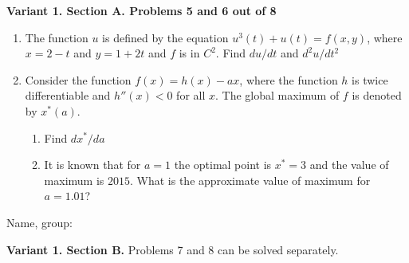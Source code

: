\documentclass[12pt,a4paper]{article}
\begin{document}
\newpage
\textbf{Variant 1. Section A. Problems 5 and 6 out of 8}


\begin{enumerate}[resume]

\item The function $u$ is defined by the equation $u^3(t) + u(t) = f(x,y)$, where $x=2-t$ and $y=1+2t$ and $f$ is in $C^2$. Find $du/dt$ and $d^2 u/dt^2$



\item Consider the function $f(x)=h(x)-ax$, where the function $h$ is twice differentiable and $h''(x)<0$ for all $x$. The global maximum of $f$ is denoted by $x^*(a)$.
\begin{enumerate}
\item Find $dx^*/da$
\item It is known that for $a=1$ the optimal point is $x^*=3$ and the value of maximum is $2015$. What is the approximate value of maximum for $a=1.01$?
\end{enumerate}

\end{enumerate}

\begin{framed}
\begin{minipage}{42em}
Name, group:\vspace*{3ex}\par 
\noindent\dotfill
\end{minipage}
\end{framed}



\newpage
\textbf{Variant 1. Section B.} Problems 7 and 8 can be solved separately.
\end{document}
